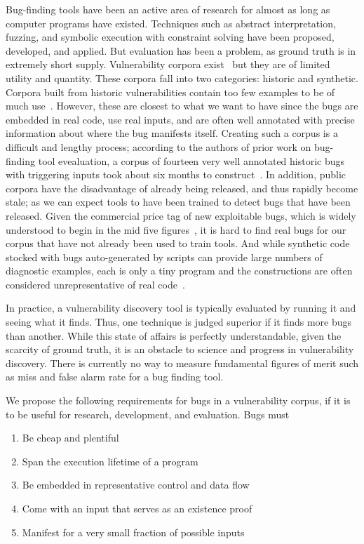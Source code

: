 \label{sec:motivation}

Bug-finding tools have been an active area of research for almost as long as computer programs have existed. 
Techniques such as abstract interpretation, fuzzing, and symbolic execution with constraint solving have been proposed, developed, and applied.
But evaluation has been a problem, as  ground truth is in extremely short supply.
Vulnerability corpora exist~\cite{Kass:2005} but they are of limited utility and quantity.
These corpora fall into two categories: historic and synthetic.
Corpora built from historic vulnerabilities contain too few examples to be of much use~\cite{Zitser:2004}.
However, these are closest to what we want to have since the bugs are embedded in real code, use real inputs, and are often well annotated with precise information about where the bug manifests itself.
Creating such a corpus is a difficult and lengthy process; according to the authors of prior work on bug-finding tool evealuation, a corpus of fourteen very well annotated historic bugs with triggering inputs took about six months to construct~\cite{ActuallyTim}.
In addition, public corpora have the disadvantage of already being released, and thus rapidly become stale; as we can expect tools to have been trained to detect bugs that have been released.
Given the commercial price tag of new exploitable bugs, which is widely understood to begin in the mid five figures~\cite{Tsyrklevich:2015}, it is hard to find real bugs for our corpus that have not already been used to train tools.
And while synthetic code stocked with bugs auto-generated by scripts can provide large numbers of diagnostic examples, each is only a tiny program and the constructions are often considered unrepresentative of real code~\cite{Juliet:2012,Kratkiewicz:2005}.

In practice, a vulnerability discovery tool is typically evaluated by running it and seeing what it finds. 
Thus, one technique is judged superior if it finds more bugs than another.
While this state of affairs is perfectly understandable, given the scarcity of ground truth, it is an obstacle to science and progress in vulnerability discovery.
There is currently no way to measure fundamental figures of merit such as miss and false alarm rate for a bug finding tool.

We propose the following requirements for bugs in a vulnerability corpus, if it is to be useful for research, development, and evaluation.
Bugs must

\begin{enumerate}
\item Be cheap and plentiful
\item Span the execution lifetime of a program
\item Be embedded in representative control and data flow
\item Come with an input that serves as an existence proof 
\item Manifest for a very small fraction of possible inputs
\end {enumerate}


